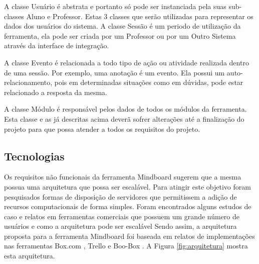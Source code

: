  


A classe Usuário é abstrata e portanto só pode ser instanciada pela suas sub-classes Aluno e Professor. Estas 3 classes que serão utilizadas para representar os dados dos usuários do sistema. A classe Sessão é um periodo de utilização da ferramenta, ela pode ser criada por um Professor ou por um Outro Sistema através da interface de integração.

A classe Evento é relacionada a todo tipo de ação ou atividade realizada dentro de uma sessão. Por exemplo, uma anotação é um evento. Ela possui um auto-relacionamento, pois em determinadas situações como em dúvidas,  pode estar relacionado a resposta da mesma.

A classe Módulo é responsável pelos dados de todos os módulos da ferramenta. Esta classe e as já descritas acima deverã sofrer alterações até a finalização do projeto para que possa atender a todos os requisitos do projeto. 

\subsection{Tecnologias}
\label{sec:tecnologias}

Os requisitos não funcionais da ferramenta Mindboard sugerem que a mesma possua uma arquitetura que possa ser escalável. Para atingir este objetivo foram pesquisados formas de disposição de servidores que permitissem a adição de recursos computacionais de forma simples. Foram encontrados alguns estudos de caso e relatos em ferramentas comerciais que possuem um grande número de usuários e como a arquitetura pode ser escalável Sendo assim, a arquitetura proposta para a ferramenta Mindboard foi baseada em relatos de implementações nas ferramentas Box.com \cite{boxcom}, Trello \cite{trello} e Boo-Box \cite{boobox}. A Figura \ref{fig:arquitetura} mostra esta arquitetura.

